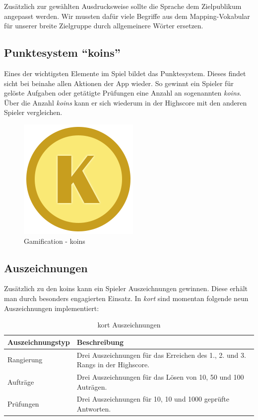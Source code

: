 Zusätzlich zur gewählten Ausdrucksweise sollte die Sprache dem Zielpublikum angepasst werden.
Wir mussten dafür viele Begriffe aus dem Mapping-Vokabular für unserer breite Zielgruppe durch allgemeinere Wörter ersetzen.

\subsection{Punktesystem "`koins"'}
Eines der wichtigsten Elemente im Spiel bildet das Punktesystem. Dieses findet sicht bei beinahe allen Aktionen der App wieder. So gewinnt ein Spieler für gelöste Aufgaben oder getätigte Prüfungen eine Anzahl an sogenannten \emph{koins}. Über die Anzahl \emph{koins} kann er sich wiederum in der Highscore mit den anderen Spieler vergleichen.

\begin{figure}[H]
	\centering
	\includegraphics[scale=0.4]{images/gamification/gamification-koin}
	\caption{Gamification - koins}
	\label{gamification-koins}
\end{figure}

\subsection{Auszeichnungen}
Zusätzlich zu den koins kann ein Spieler Auszeichnungen gewinnen. Diese erhält man durch besonders engagierten Einsatz. In \emph{kort} sind momentan folgende neun Auszeichnungen implementiert:

\begin{table}[H]
\centering
\begin{tabular}{|p{0.3\twocelltabwidth}|p{0.7\twocelltabwidth}|}
\hline 
\textbf{Auszeichnungstyp} & \textbf{Beschreibung} \\ 
\hline 
Rangierung & Drei Auszeichnungen für das Erreichen des 1., 2. und 3. Rangs in der Highscore. \\ 
\hline 
Aufträge & Drei Auszeichnungen für das Lösen von 10, 50 und 100 Auträgen. \\ 
\hline 
Prüfungen & Drei Auszeichnungen für 10, 10 und 1000 geprüfte Antworten. \\ 
\hline 
\end{tabular} 
\caption{kort Auszeichnungen}
\label{kort-badges}
\end{table}

